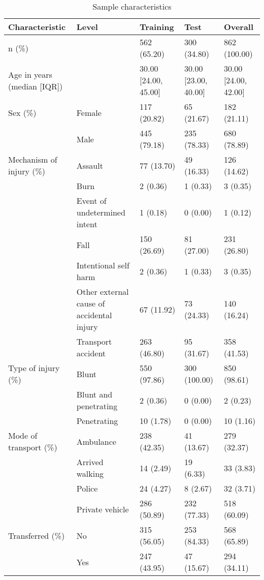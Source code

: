 \documentclass[10pt,letterpaper]{article}\usepackage[]{graphicx}\usepackage[]{color}
\begin{document}
\begin{table}[ht]
\centering
\caption{Sample characteristics} 
\label{tab:sample-characteristics}
\begin{adjustbox}{max width=\textwidth} 
\begin{tabular} 
{lllll}
  \hline
Characteristic & Level & Training & Test & Overall \\ 
  \hline
n (\%) &  & 562 (65.20) & 300 (34.80) & 862 (100.00) \\ 
  Age in years (median [IQR]) &  & 30.00 [24.00, 45.00] & 30.00 [23.00, 40.00] & 30.00 [24.00, 42.00] \\ 
  Sex (\%) & Female & 117 (20.82) & 65 (21.67) & 182 (21.11) \\ 
   & Male & 445 (79.18) & 235 (78.33) & 680 (78.89) \\ 
  Mechanism of injury (\%) & Assault & 77 (13.70) & 49 (16.33) & 126 (14.62) \\ 
   & Burn & 2 (0.36) & 1 (0.33) & 3 (0.35) \\ 
   & Event of undetermined intent & 1 (0.18) & 0 (0.00) & 1 (0.12) \\ 
   & Fall & 150 (26.69) & 81 (27.00) & 231 (26.80) \\ 
   & Intentional self harm & 2 (0.36) & 1 (0.33) & 3 (0.35) \\ 
   & Other external cause of accidental injury & 67 (11.92) & 73 (24.33) & 140 (16.24) \\ 
   & Transport accident & 263 (46.80) & 95 (31.67) & 358 (41.53) \\ 
  Type of injury (\%) & Blunt & 550 (97.86) & 300 (100.00) & 850 (98.61) \\ 
   & Blunt and penetrating & 2 (0.36) & 0 (0.00) & 2 (0.23) \\ 
   & Penetrating & 10 (1.78) & 0 (0.00) & 10 (1.16) \\ 
  Mode of transport (\%) & Ambulance & 238 (42.35) & 41 (13.67) & 279 (32.37) \\ 
   & Arrived walking & 14 (2.49) & 19 (6.33) & 33 (3.83) \\ 
   & Police & 24 (4.27) & 8 (2.67) & 32 (3.71) \\ 
   & Private vehicle & 286 (50.89) & 232 (77.33) & 518 (60.09) \\ 
  Transferred (\%) & No & 315 (56.05) & 253 (84.33) & 568 (65.89) \\ 
   & Yes & 247 (43.95) & 47 (15.67) & 294 (34.11) \\ 

\end{tabular}
\end{adjustbox}
\end{table}
\end{document}
